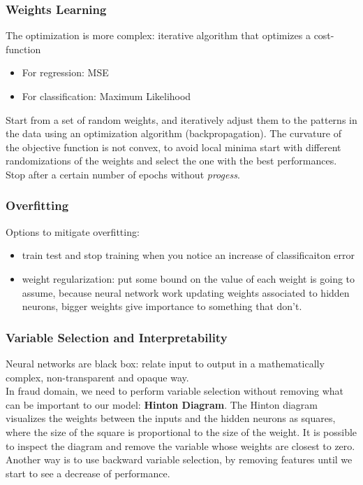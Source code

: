         \subsubsection{Weights Learning}
            The optimization is more complex: iterative algorithm that optimizes a cost-function
            \begin{itemize}
                \item For regression: MSE 
                \item For classification: Maximum Likelihood 
            \end{itemize}
            Start from a set of random weights, and iteratively adjust them to the patterns in the data using an optimization algorithm (backpropagation).
            The curvature of the objective function is not convex, to avoid local minima start with different randomizations of the weights and select the one with the best performances.\\
            Stop after a certain number of epochs without \textit{progess}.
        \subsubsection{Overfitting}
            Options to mitigate overfitting:
            \begin{itemize}
                \item train test and stop training when you notice an increase of classificaiton error 
                \item weight regularization: put some bound on the value of each weight is going to assume, because neural network work updating weights associated to hidden neurons, bigger weights give importance to something that don't.
            \end{itemize}
        \subsubsection{Variable Selection and Interpretability}
            Neural networks are black box: relate input to output in a mathematically complex, non-transparent and opaque way.\\
            In fraud domain, we need to perform variable selection without removing what can be important to our model: \textbf{Hinton Diagram}.
            The Hinton diagram visualizes the weights between the inputs and the hidden neurons as squares, where the size of the square is proportional to the size of the weight. It is possible to inspect the diagram and remove the variable whose weights are closest to zero.\\
            Another way is to use backward variable selection, by removing features until we start to see a decrease of performance.
